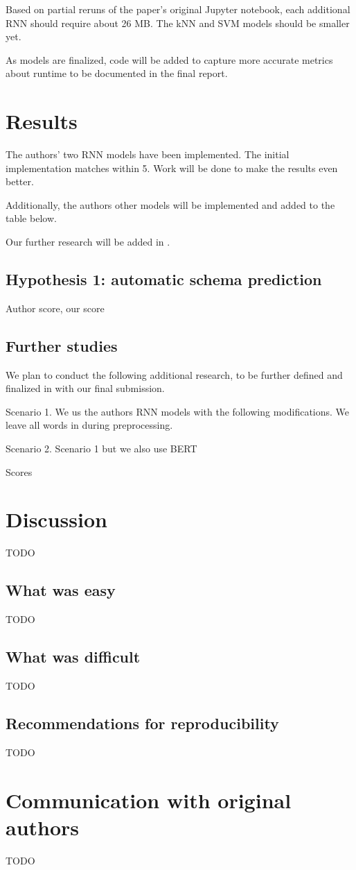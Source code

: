 \documentclass[11pt,a4paper]{article}
\begin{document}
Based on partial reruns of the paper's original Jupyter notebook, each additional RNN should require about 26 MB. The kNN and SVM models should be smaller yet.

As models are finalized, code will be added to capture more accurate metrics about runtime to be documented in the final report. 

\section{Results}
The authors' two RNN models have been implemented. The initial implementation matches within 5. Work will be done to make the results even better. 

Additionally, the authors other models will be implemented and added to the table below. 

Our further research will be added in . 

\subsection{Hypothesis 1: automatic schema prediction}

Author score, our score 

\subsection{Further studies}
\label{further_studies}

We plan to conduct the following additional research, to be further defined and finalized in with our final submission. 

Scenario 1. We us the authors RNN models with the following modifications. We leave all words in during preprocessing. 

Scenario 2. Scenario 1 but we also use BERT 

Scores

\section{Discussion}
TODO
\subsection{What was easy}
TODO
\subsection{What was difficult}
TODO
\subsection{Recommendations for reproducibility}
TODO
\section{Communication with original authors}
TODO



\end{document}
